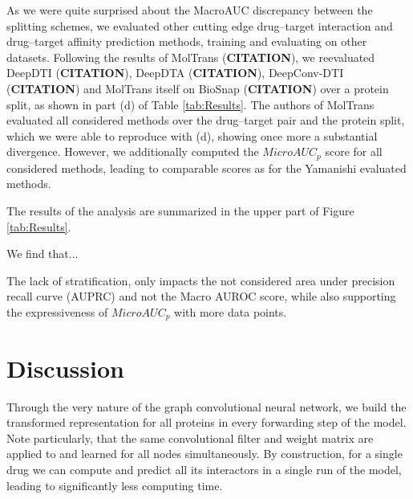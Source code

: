 \documentclass{bioinfo}
\begin{document}
As we were quite surprised about the MacroAUC discrepancy between the splitting schemes, we evaluated other cutting edge drug--target interaction and drug--target affinity prediction methods, training and evaluating on other datasets. Following the results of MolTrans (\textbf{CITATION}), we reevaluated DeepDTI (\textbf{CITATION}), DeepDTA (\textbf{CITATION}), DeepConv-DTI (\textbf{CITATION}) and MolTrans itself on BioSnap (\textbf{CITATION}) over a protein split, as shown in part (d) of Table \ref{tab:Results}. The authors of MolTrans evaluated all considered methods over the drug--target pair and the protein split, which we were able to reproduce with (d), showing once more a substantial divergence. However, we additionally computed the $MicroAUC_p$ score for all considered methods, leading to comparable scores as for the Yamanishi evaluated methods. 

The results of the analysis are summarized in the upper part of Figure
\ref{tab:Results}.

We find that...



The lack of stratification, only impacts the not
considered area under precision recall curve (AUPRC) and not the Macro
AUROC score, while also supporting the expressiveness of $MicroAUC_p$
with more data points.





\section{Discussion}


Through the very nature of the graph convolutional neural network, we
build the transformed representation for all proteins in every
forwarding step of the model. Note particularly, that the same
convolutional filter and weight matrix are applied to and learned for
all nodes simultaneously. By construction, for a single drug we can
compute and predict all its interactors in a single run of the model,
leading to significantly less computing time.
\end{document}
